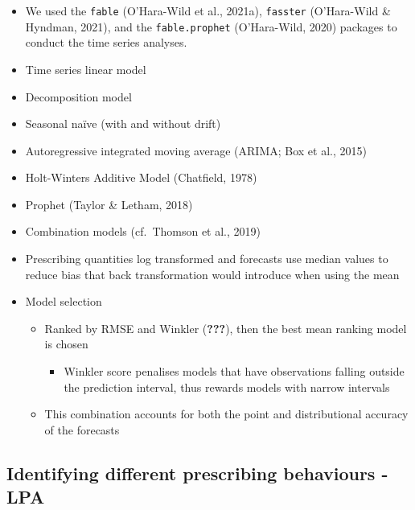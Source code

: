\documentclass[
  english,
  man,floatsintext]{apa7}
\providecommand{\tightlist}{%
  \setlength{\itemsep}{0pt}\setlength{\parskip}{0pt}}
\begin{document}
\begin{itemize}
  \begin{itemize}
  \tightlist
  \item
    We used the \texttt{fable} (O'Hara-Wild et al., 2021a), \texttt{fasster} (O'Hara-Wild \& Hyndman, 2021), and the \texttt{fable.prophet} (O'Hara-Wild, 2020) packages to conduct the time series analyses.
  \item
    Time series linear model
  \item
    Decomposition model
  \item
    Seasonal naïve (with and without drift)
  \item
    Autoregressive integrated moving average (ARIMA; Box et al., 2015)
  \item
    Holt-Winters Additive Model (Chatfield, 1978)
  \item
    Prophet (Taylor \& Letham, 2018)
  \item
    Combination models (cf.~Thomson et al., 2019)
  \item
    Prescribing quantities log transformed and forecasts use median values to reduce bias that back transformation would introduce when using the mean
  \item
    Model selection

    \begin{itemize}
    \tightlist
    \item
      Ranked by RMSE and Winkler ({\textbf{???}}), then the best mean ranking model is chosen

      \begin{itemize}
      \tightlist
      \item
        Winkler score penalises models that have observations falling outside the prediction interval, thus rewards models with narrow intervals
      \end{itemize}
    \item
      This combination accounts for both the point and distributional accuracy of the forecasts
    \end{itemize}
  \end{itemize}
\end{itemize}

\hypertarget{identifying-different-prescribing-behaviours---lpa}{%
\subsection{Identifying different prescribing behaviours - LPA}\label{identifying-different-prescribing-behaviours---lpa}}
\end{document}
